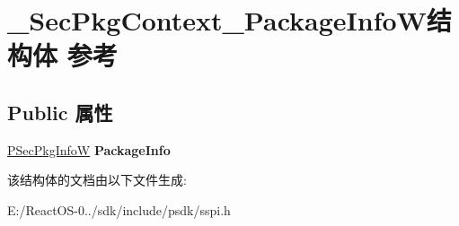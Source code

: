 \hypertarget{struct___sec_pkg_context___package_info_w}{}\section{\+\_\+\+Sec\+Pkg\+Context\+\_\+\+Package\+Info\+W结构体 参考}
\label{struct___sec_pkg_context___package_info_w}
\subsection*{Public 属性}
\begin{DoxyCompactItemize}
\item 
\mbox{\label{struct___sec_pkg_context___package_info_w_a18796066c1237115921262c4c402e747}} 
\hyperlink{struct___sec_pkg_info_w}{P\+Sec\+Pkg\+InfoW} {\bfseries Package\+Info}
\end{DoxyCompactItemize}


该结构体的文档由以下文件生成\+:\begin{DoxyCompactItemize}
\item 
E\+:/\+React\+O\+S-\/0../sdk/include/psdk/sspi.\+h\end{DoxyCompactItemize}
